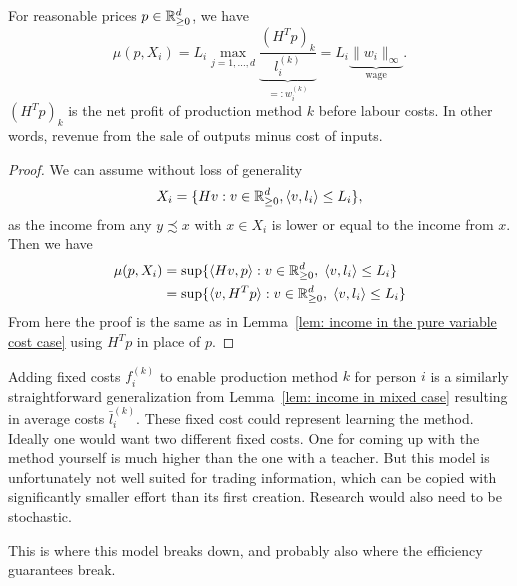 \begin{lemma}
	For reasonable prices \(p\in \mathbb{R}_{\ge 0}^d\), we have
	\[
		\mu(p, X_i)
		= L_i \max_{j=1,\dots,d}
		\underbrace{\frac{(H^T p)_k}{l_i^{(k)}}}_{=:w_i^{(k)}}
		= L_i \underbrace{\|w_i\|_\infty}_{\text{wage}}.
	\]
	\((H^T p)_k\) is the net profit of production method \(k\) before labour
	costs. In other words, revenue from the sale of outputs minus cost of inputs.
\end{lemma}
\begin{proof}
	We can assume without loss of generality
	\[
		X_i = \{ Hv : v\in \mathbb{R}_{\ge 0}^d, \langle v, l_i\rangle \le L_i\},
	\]
	as the income from any \(y\precsim x\) with \(x\in X_i\) is lower or equal
	to the income from \(x\). Then we have
	\[\begin{aligned}
		\mu(p, X_i)
		&= \sup\{
			\langle Hv, p\rangle :
			v\in \mathbb{R}_{\ge 0}^d,\; \langle v, l_i\rangle \le L_i
		\}\\
		&= \sup\{
			\langle v, H^T p\rangle :
			v\in \mathbb{R}_{\ge 0}^d,\; \langle v, l_i\rangle \le L_i
		\}
	\end{aligned}\]
	From here the proof is the same as in Lemma~\ref{lem: income in the pure variable cost case}
	using \(H^T p\) in place of \(p\).
\end{proof}

Adding fixed costs \(f^{(k)}_i\) to enable production method \(k\) for person
\(i\) is a similarly straightforward generalization from Lemma~\ref{lem: income
in mixed case} resulting in average costs \(\bar{l}_i^{(k)}\). These fixed cost
could represent learning the method. Ideally one would want two different fixed
costs. One for coming up with the method yourself is much higher than the one
with a teacher. But this model is unfortunately not well suited for trading
information, which can be copied with significantly smaller effort
than its first creation. Research would also need to be stochastic.

This is where this model breaks down, and probably also where the efficiency
guarantees break.
